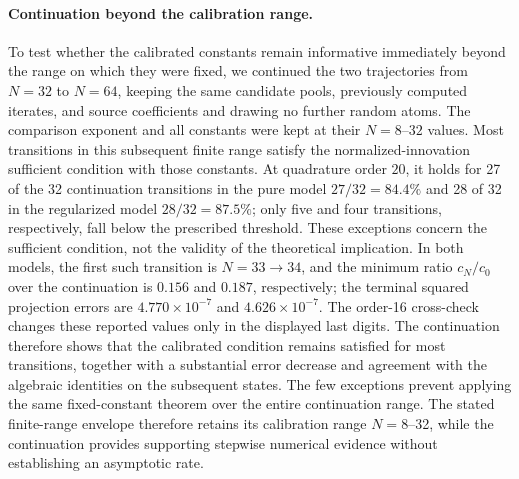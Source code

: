 \paragraph{Continuation beyond the calibration range.}
To test whether the calibrated constants remain informative immediately beyond the range on which
they were fixed, we continued the two trajectories from \(N=32\) to \(N=64\), keeping the same
candidate pools, previously computed iterates, and source coefficients and drawing no further random atoms. The
comparison exponent and all constants were kept at their \(N=8\)--\(32\) values. Most transitions in
this subsequent finite range satisfy the normalized-innovation sufficient condition with those constants.
At quadrature order \(20\), it holds for 27 of the 32 continuation transitions in the pure model
\(27/32=84.4\%\) and 28 of 32 in the regularized model
\(28/32=87.5\%\); only five and four transitions, respectively, fall
below the prescribed threshold. These exceptions concern the sufficient condition, not the validity
of the theoretical implication. In both models, the first such transition is \(N=33\to34\), and the
minimum ratio \(c_N/c_0\) over the continuation is \(0.156\) and \(0.187\), respectively; the
terminal squared projection errors are \(4.770\times10^{-7}\) and \(4.626\times10^{-7}\). The
order-16 cross-check changes these reported values only in the displayed last digits. The
continuation therefore shows that the calibrated condition remains satisfied for
most transitions, together with a substantial error decrease and agreement with the algebraic
identities on the subsequent states. The few exceptions prevent applying the same fixed-constant
theorem over the entire continuation range. The stated finite-range envelope therefore retains
its calibration range $N=8$--32, while the continuation provides supporting stepwise numerical
evidence without establishing an asymptotic rate.


\FloatBarrier
